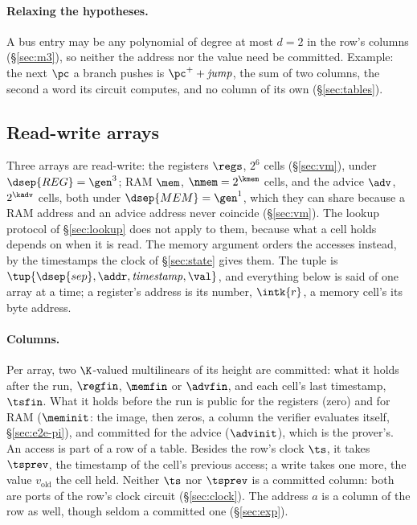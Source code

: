\paragraph{Relaxing the hypotheses.} A bus entry may be any polynomial of degree at most $d = 2$ in the row's columns (\S\ref{sec:m3}), so neither the address nor the value need be committed. Example: the next $\pc$ a branch pushes is $\pc^{+}+\mathit{jump}$, the sum of two columns, the second a word its circuit computes, and no column of its own (\S\ref{sec:tables}).

\subsection{Read-write arrays}\label{sec:memchan}

Three arrays are read-write: the registers $\regs$, $2^{6}$ cells (\S\ref{sec:vm}), under $\dsep{REG}=\gen^{3}$; RAM $\mem$, $\nmem=2^{\kmem}$ cells, and the advice $\adv$, $2^{\kadv}$ cells, both under $\dsep{MEM}=\gen^{1}$, which they can share because a RAM address and an advice address never coincide (\S\ref{sec:vm}). The lookup protocol of \S\ref{sec:lookup} does not apply to them, because what a cell holds depends on when it is read. The memory argument orders the accesses instead, by the timestamps the clock of \S\ref{sec:state} gives them. The tuple is $\tup{\dsep{sep},\addr,\mathit{timestamp},\val}$, and everything below is said of one array at a time; a register's address is its number, $\intk{r}$, a memory cell's its byte address.

\paragraph{Columns.} Per array, two $\K$-valued multilinears of its height are committed: what it holds after the run, $\regfin$, $\memfin$ or $\advfin$, and each cell's last timestamp, $\tsfin$. What it holds before the run is public for the registers (zero) and for RAM ($\meminit$: the image, then zeros, a column the verifier evaluates itself, \S\ref{sec:e2e-pi}), and committed for the advice ($\advinit$), which is the prover's. An access is part of a row of a table. Besides the row's clock $\ts$, it takes $\tsprev$, the timestamp of the cell's previous access; a write takes one more, the value $v_{\mathrm{old}}$ the cell held. Neither $\ts$ nor $\tsprev$ is a committed column: both are ports of the row's clock circuit (\S\ref{sec:clock}). The address $a$ is a column of the row as well, though seldom a committed one (\S\ref{sec:exp}).

